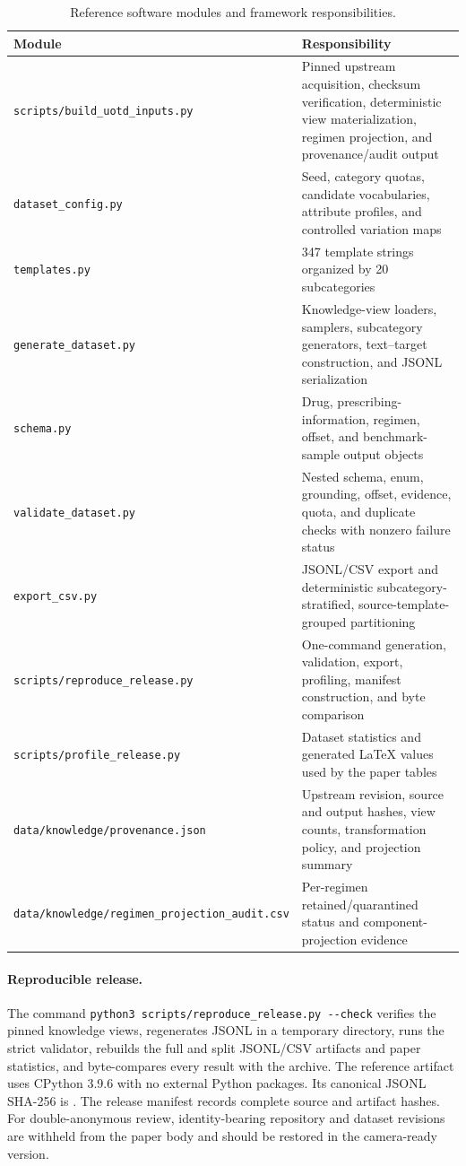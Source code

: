 \documentclass[conference]{IEEEtran}
\newcommand{\code}[1]{\texttt{#1}}
\begin{document}
\begin{table}[t]
\caption{Reference software modules and framework responsibilities.}
\label{tab:modules}
\centering
\footnotesize
\begin{tabularx}{\textwidth}{@{}l Y@{}}
\toprule
\textbf{Module} & \textbf{Responsibility} \\
\midrule
\code{scripts/build\_uotd\_inputs.py} & Pinned upstream acquisition, checksum verification, deterministic view materialization, regimen projection, and provenance/audit output \\
\code{dataset\_config.py} & Seed, category quotas, candidate vocabularies, attribute profiles, and controlled variation maps \\
\code{templates.py} & 347 template strings organized by 20 subcategories \\
\code{generate\_dataset.py} & Knowledge-view loaders, samplers, subcategory generators, text--target construction, and JSONL serialization \\
\code{schema.py} & Drug, prescribing-information, regimen, offset, and benchmark-sample output objects \\
\code{validate\_dataset.py} & Nested schema, enum, grounding, offset, evidence, quota, and duplicate checks with nonzero failure status \\
\code{export\_csv.py} & JSONL/CSV export and deterministic subcategory-stratified, source-template-grouped partitioning \\
\code{scripts/reproduce\_release.py} & One-command generation, validation, export, profiling, manifest construction, and byte comparison \\
\code{scripts/profile\_release.py} & Dataset statistics and generated LaTeX values used by the paper tables \\
\code{data/knowledge/provenance.json} & Upstream revision, source and output hashes, view counts, transformation policy, and projection summary \\
\code{data/knowledge/regimen\_projection\_audit.csv} & Per-regimen retained/quarantined status and component-projection evidence \\
\bottomrule
\end{tabularx}
\end{table}

\paragraph{Reproducible release.}
The command \code{python3 scripts/reproduce\_release.py {-}{-}check} verifies
the pinned knowledge views, regenerates JSONL in a temporary directory, runs
the strict validator, rebuilds the full and split JSONL/CSV artifacts and paper
statistics, and byte-compares every result with the archive. The reference
artifact uses CPython 3.9.6 with no external Python packages. Its canonical
JSONL SHA-256 is
\code{\FinalJsonlShaA}\allowbreak\code{\FinalJsonlShaB}. The release manifest
records complete source and artifact hashes. For double-anonymous review,
identity-bearing repository and dataset revisions are withheld from the paper
body and should be restored in the camera-ready version.
\end{document}
